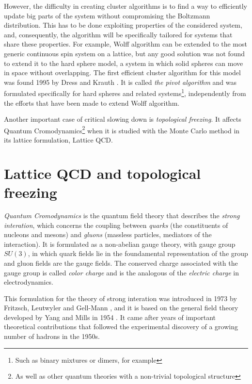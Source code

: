 However, the difficulty in creating cluster algorithms is to find a way to efficiently update big parts of the system without compromising the Boltzmann distribution.
This has to be done exploiting properties of the considered system, and, consequently, the algorithm will be specifically tailored for systems that share these properties.
For example, Wolff algorithm can be extended to the most generic continuous spin system on a lattice,
but any good solution was not found to extend it to the hard sphere model,
\ie a system in which solid spheres can move in space without overlapping.
The first efficient cluster algorithm for this model was found 1995 by Dress and Krauth \cite{dress-krauth:1995}.
It is called \emph{the pivot algorithm} and was formulated specifically for hard spheres and related systems\footnote{Such as binary mixtures or dimers, for example},
independently from the efforts that have been made to extend Wolff algorithm.

Another important case of critical slowing down is \emph{topological freezing}.
It affects Quantum Cromodynamics\footnote{As well as other quantum theories with a non-trivial topological structure}
when it is studied with the Monte Carlo method in its lattice formulation, \ie Lattice QCD.

\section*{Lattice QCD and topological freezing}
\emph{Quantum Cromodynamics} is the quantum field theory that describes the \emph{strong interation},
which concerns the coupling between \emph{quarks} (the constituents of nucleons and mesons) and \emph{gluons} (massless particles, mediators of the interaction).
It is formulated as a non-abelian gauge theory, with gauge group $SU(3)$,
in which quark fields lie in the foundamental representation of the group and gluon fields are the gauge fields.
The conserved charge associated with the gauge group is called \emph{color charge} and is the analogous of the \emph{electric charge} in electrodynamics.

This formulation for the theory of strong interation was introduced in 1973 by Fritzsch, Leutwyler and Gell-Mann \cite{fritzsch:1973},
and it is based on the general field theory developed by Yang and Mills in 1954 \cite{yang-mills:1954}.
It came after years of important theoretical contributions that followed the experimental discovery of a growing number of hadrons in the 1950s.

